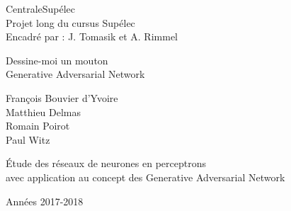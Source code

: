 
\begin{titlepage}

\setlength{\hoffset}{-1in}
\setlength{\voffset}{-1in}
\setlength{\topmargin}{1.5cm}
\setlength{\headheight}{0.5cm}
\setlength{\headsep}{1cm}
\setlength{\oddsidemargin}{3cm}
\setlength{\evensidemargin}{3cm}
\setlength{\footskip}{1.5cm}
\enlargethispage{1cm}

\fontsize{12pt}{14pt}
\selectfont

\begin{center}


\vspace{0.5cm}

CentraleSupélec\\
Projet long du cursus Supélec\\
Encadré par : J. Tomasik et A. Rimmel

\vspace{3.5cm}

\fontsize{17.28pt}{21pt}
\selectfont

Dessine-moi un mouton\\
Generative Adversarial Network

\fontsize{12pt}{14pt}
\selectfont

\vspace{.6cm}

\vspace{.4cm}

\vspace{3.5cm}

François Bouvier d'Yvoire\\
Matthieu Delmas \\
Romain Poirot \\
Paul Witz

\vspace{2cm}

Étude des réseaux de neurones en perceptrons \\ avec application au concept des Generative Adversarial Network


\vspace{1cm}

Années 2017-2018

\end{center}
\end{titlepage}
